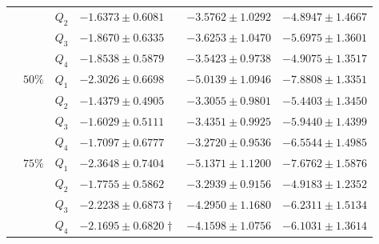 \begin{table}[h]
{\begin{tabular}{@{}ccclll@{}}
 &  & $Q_{2}$ & $\mathbf{-1.6373 \pm 0.6081}$ & $-3.5762 \pm 1.0292$ & $\mathbf{-4.8947 \pm 1.4667}$ \\
 &  & $Q_{3}$ & $-1.8670 \pm 0.6335$ & $-3.6253 \pm 1.0470$ & $-5.6975 \pm 1.3601$ \\
 &  & $Q_{4}$ & $-1.8538 \pm 0.5879$ & $\mathbf{-3.5423 \pm 0.9738}$ & $-4.9075 \pm 1.3517$ \\ \cmidrule(l){2-6} 
 & $50\%$ & $Q_{1}$ & $-2.3026 \pm 0.6698$ & $-5.0139 \pm 1.0946$ & $-7.8808 \pm 1.3351$ \\
 &  & $Q_{2}$ & $\mathbf{-1.4379 \pm 0.4905}$ & $-3.3055 \pm 0.9801$ & $\mathbf{-5.4403 \pm 1.3450}$ \\
 &  & $Q_{3}$ & $-1.6029 \pm 0.5111$ & $-3.4351 \pm 0.9925$ & $-5.9440 \pm 1.4399$ \\
 &  & $Q_{4}$ & $-1.7097 \pm 0.6777$ & $\mathbf{-3.2720 \pm 0.9536}$ & $-6.5544 \pm 1.4985$ \\ \cmidrule(l){2-6} 
 & $75\%$ & $Q_{1}$ & $-2.3648 \pm 0.7404$ & $-5.1371 \pm 1.1200$ & $-7.6762 \pm 1.5876$ \\
 &  & $Q_{2}$ & $\mathbf{-1.7755 \pm 0.5862}$ & $\mathbf{-3.2939 \pm 0.9156}$ & $\mathbf{-4.9183 \pm 1.2352}$ \\
 &  & $Q_{3}$ & $-2.2238 \pm 0.6873\dagger$ & $-4.2950 \pm 1.1680$ & $-6.2311 \pm 1.5134$ \\
 &  & $Q_{4}$ & $-2.1695 \pm 0.6820\dagger$ & $-4.1598 \pm 1.0756$ & $-6.1031 \pm 1.3614$ \\ \bottomrule
\end{tabular}%
}
\end{table}


